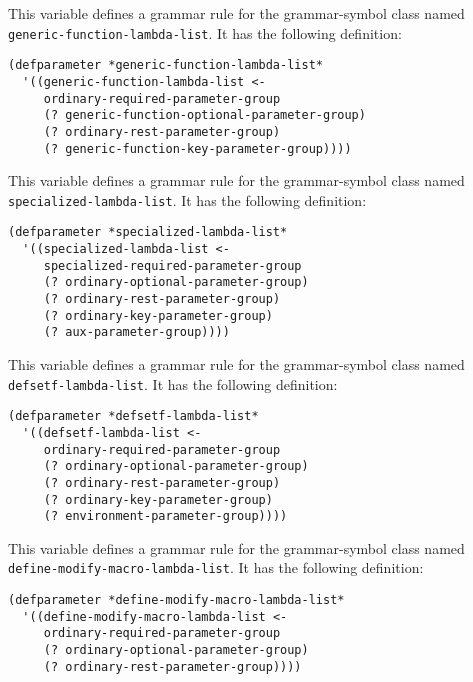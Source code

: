 
This variable defines a grammar rule for the grammar-symbol class
named \texttt{generic-function-lambda-list}.  It has the following
definition:

\begin{verbatim}
(defparameter *generic-function-lambda-list*
  '((generic-function-lambda-list <-
     ordinary-required-parameter-group
     (? generic-function-optional-parameter-group)
     (? ordinary-rest-parameter-group)
     (? generic-function-key-parameter-group))))
\end{verbatim}


This variable defines a grammar rule for the grammar-symbol class
named \texttt{specialized-lambda-list}.  It has the following
definition:

\begin{verbatim}
(defparameter *specialized-lambda-list*
  '((specialized-lambda-list <-
     specialized-required-parameter-group
     (? ordinary-optional-parameter-group)
     (? ordinary-rest-parameter-group)
     (? ordinary-key-parameter-group)
     (? aux-parameter-group))))
\end{verbatim}


This variable defines a grammar rule for the grammar-symbol class
named \texttt{defsetf-lambda-list}.  It has the following
definition:

\begin{verbatim}
(defparameter *defsetf-lambda-list*
  '((defsetf-lambda-list <-
     ordinary-required-parameter-group
     (? ordinary-optional-parameter-group)
     (? ordinary-rest-parameter-group)
     (? ordinary-key-parameter-group)
     (? environment-parameter-group))))
\end{verbatim}


This variable defines a grammar rule for the grammar-symbol class
named \texttt{define-modify-macro-lambda-list}.  It has the following
definition:

\begin{verbatim}
(defparameter *define-modify-macro-lambda-list*
  '((define-modify-macro-lambda-list <-
     ordinary-required-parameter-group
     (? ordinary-optional-parameter-group)
     (? ordinary-rest-parameter-group))))
\end{verbatim}

